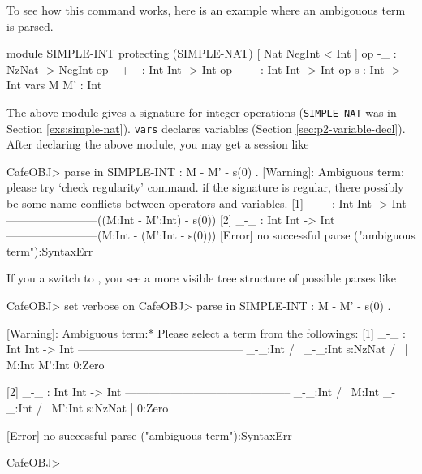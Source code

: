 \documentclass[a4paper]{memoir}
\begin{document}
To see how this command works, here is an example where an ambigouous term
is parsed.
\label{exs:simple-int}
\begin{vvtm}
\begin{ccode}
  module SIMPLE-INT {
    protecting (SIMPLE-NAT)
    [ Nat NegInt < Int ]
    op -_ : NzNat -> NegInt
    op _+_ : Int Int -> Int
    op _-_ : Int Int -> Int
    op s : Int -> Int
    vars M M' : Int
  }
\end{ccode}
\end{vvtm}
The above module gives a signature for integer operations
(\verb|SIMPLE-NAT| was in Section \ref{exs:simple-nat}).
\verb|vars| declares
variables (Section \ref{sec:p2-variable-decl}). After declaring
the above module, you may get a session like
\begin{vvtm}
\begin{ccode}
  CafeOBJ> parse in SIMPLE-INT : M - M' - s(0) .
  [Warning]: Ambiguous term:
      please try `check regularity' command.
      if the signature is regular, there possibly be 
      some name conflicts between operators and variables.
  [1] _-_ : Int Int -> Int ------------------------((M:Int - M':Int) - s(0))
  [2] _-_ : Int Int -> Int ------------------------(M:Int - (M':Int - s(0)))
  [Error] no successful parse
    ("ambiguous term"):SyntaxErr
\end{ccode}
\end{vvtm}
If you  a switch  to , 
you see a more visible tree structure of possible parses like
\begin{vvtm}
\begin{ccode}
  CafeOBJ> set verbose on
  CafeOBJ> parse in SIMPLE-INT : M - M' - s(0) .

  [Warning]: Ambiguous term:* Please select a term from the followings:
  [1] _-_ : Int Int -> Int --------------------------------------------
            _-_:Int        
        /             \     
     _-_:Int       s:NzNat
    /       \         |     
  M:Int  M':Int    0:Zero  
                          
  [2] _-_ : Int Int -> Int --------------------------------------------
       _-_:Int             
    /            \          
  M:Int       _-_:Int      
            /         \     
         M':Int    s:NzNat
                      |     
                   0:Zero  

  [Error] no successful parse
    ("ambiguous term"):SyntaxErr

  CafeOBJ> 
\end{ccode}
\end{vvtm}
\end{document}
